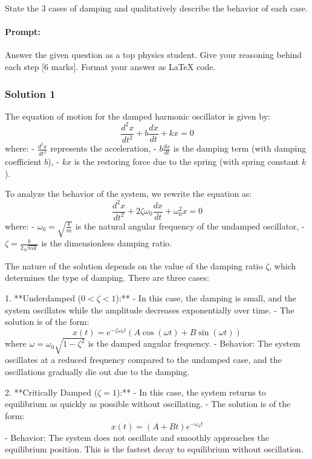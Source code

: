 \documentclass{article}
\begin{document}
State the 3 cases of damping and qualitatively describe the behavior of each case.

\paragraph{Prompt: \\} 
Answer the given question as a top physics student. Give your reasoning behind each step [6 marks].
Format your answer as LaTeX code. 


\subsubsection{Solution 1}
The equation of motion for the damped harmonic oscillator is given by:
\[
\frac{d^2x}{dt^2} + b\frac{dx}{dt} + kx = 0
\]
where:
- \( \frac{d^2x}{dt^2} \) represents the acceleration,
- \( b\frac{dx}{dt} \) is the damping term (with damping coefficient \( b \)),
- \( kx \) is the restoring force due to the spring (with spring constant \( k \)).

To analyze the behavior of the system, we rewrite the equation as:
\[
\frac{d^2x}{dt^2} + 2\zeta\omega_0\frac{dx}{dt} + \omega_0^2x = 0
\]
where:
- \( \omega_0 = \sqrt{\frac{k}{m}} \) is the natural angular frequency of the undamped oscillator,
- \( \zeta = \frac{b}{2\sqrt{mk}} \) is the dimensionless damping ratio.

The nature of the solution depends on the value of the damping ratio \( \zeta \), which determines the type of damping. There are three cases:

1. **Underdamped (\( 0 < \zeta < 1 \)):**
   - In this case, the damping is small, and the system oscillates while the amplitude decreases exponentially over time.
   - The solution is of the form:
     \[
     x(t) = e^{-\zeta\omega_0 t} \left( A \cos(\omega t) + B \sin(\omega t) \right)
     \]
     where \( \omega = \omega_0 \sqrt{1 - \zeta^2} \) is the damped angular frequency.
   - Behavior: The system oscillates at a reduced frequency compared to the undamped case, and the oscillations gradually die out due to the damping.

2. **Critically Damped (\( \zeta = 1 \)):**
   - In this case, the system returns to equilibrium as quickly as possible without oscillating.
   - The solution is of the form:
     \[
     x(t) = (A + Bt)e^{-\omega_0 t}
     \]
   - Behavior: The system does not oscillate and smoothly approaches the equilibrium position. This is the fastest decay to equilibrium without oscillation.
\end{document}
